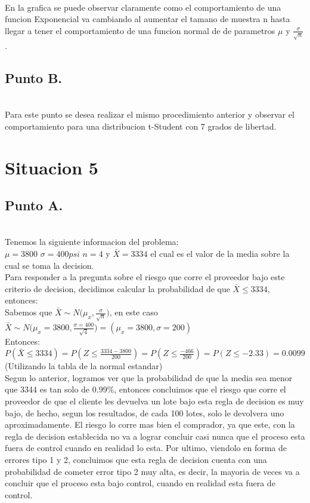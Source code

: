 \documentclass[letterpaper,12pt,onecolumn,titlepage]{article}
\begin{document}
~\\En la grafica se puede observar claramente como el comportamiento de una funcion Exponencial va cambiando al aumentar el tamano de muestra n hasta llegar a tener el comportamiento de una funcion normal de de parametros $\mu$ y $\frac{\sigma}{\sqrt{n}}$. 
\subsection{Punto B.}
~\\ Para este punto se desea realizar el mismo procedimiento anterior y observar el comportamiento para una distribucion t-Student con 7 grados de libertad.

\section{Situacion 5}
\subsection{Punto A.}
~\\ Tenemos la siguiente informacion del problema:
~\\ $\mu=3800$  $\sigma=400psi$ $n=4$ y $\bar{X}=3334$ el cual es el valor de la media sobre la cual se toma la decision.
~\\ Para responder a la pregunta sobre el riesgo que corre el proveedor bajo este criterio de decision, decidimos calcular la probabilidad de que $\bar{X}\leq3334$, entonces:
~\\ Sabemos que $\bar{X}\sim{N(\mu_x,\frac{\sigma}{\sqrt{n}}})$, en este caso $\bar{X}\sim{N(\mu_x=3800,\frac{\sigma=400}{\sqrt{4}}})=(\mu_x=3800,\sigma=200)$
~\\Entonces:
~\\ $P(\bar{X}\leq3334)=P(Z\leq\frac{3334-3800}{200})=P(Z\leq\frac{-466}{200})=P(Z\leq-2.33)=0.0099$ (Utilizando la tabla de la normal estandar)
~\\Segun lo anterior, logramos ver que la probabilidad de que la media sea menor que 3344 es tan solo de 0.99\%, entonces concluimos que el riesgo que corre el proveedor de que el cliente les devuelva un lote bajo esta regla de decision es muy bajo, de hecho, segun los resultados, de cada 100 lotes, solo le devolvera uno aproximadamente. El riesgo lo corre mas bien el comprador, ya que este, con la regla de decision establecida no va a lograr concluir casi nunca que el proceso esta fuera de control cuando en realidad lo esta. Por ultimo, viendolo en forma de errores tipo 1 y 2, concluimos que esta regla de decision cuenta con una probabilidad de cometer error tipo 2 muy alta, es decir, la mayoria de veces va a concluir que el proceso esta bajo control, cuando en realidad esta fuera de control.
\end{document}
